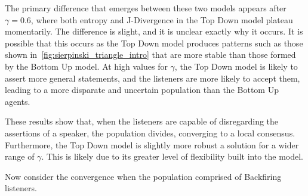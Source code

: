 The primary difference that emerges between these two models appears after $\gamma = 0.6$, where both entropy and J-Divergence in the Top Down model plateau momentarily. The difference is slight, and it is unclear exactly why it occurs. It is possible that this occurs as the Top Down model produces patterns such as those shown in~\cref{fig:sierpinski_triangle_intro} that are more stable than those formed by the Bottom Up model. At high values for $\gamma$, the Top Down model is likely to assert more general statements, and the listeners are more likely to accept them, leading to a more disparate and uncertain population than the Bottom Up agents. 

These results show that, when the listeners are capable of disregarding the assertions of a speaker, the population divides, converging to a local consensus. Furthermore, the Top Down model is slightly more robust a solution for a wider range of $\gamma$. This is likely due to its greater level of flexibility built into the model. 

Now consider the convergence when the population comprised of Backfiring listeners. 


